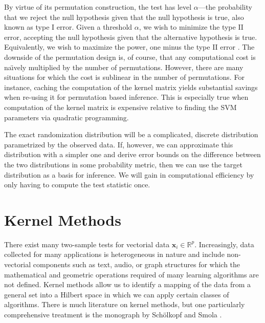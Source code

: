 By virtue of its permutation construction, the test has level $\alpha$---the
probability that we reject the null hypothesis given
that the null hypothesis is true, also known as type I error.  Given a
threshold $\alpha$, we wish to minimize the type II error, accepting
the null hypothesis given that the alternative hypothesis is true.
Equivalently, we wish to maximize the power, one minus the type II
error \cite{lehmann2005testing}.  The downside of the permutation
design is, of course, that any computational cost is na\"\i vely
multiplied by the number of permutations.  However, there are many
situations for which the cost is sublinear in the number of
permutations.  For instance, caching the computation of the kernel matrix
yields substantial savings when re-using it for permutation based
inference.  This is especially true when computation of the kernel
matrix is expensive relative to finding the SVM parameters via
quadratic programming.

The exact randomization distribution will be a complicated, discrete distribution
parametrized by the observed data.  If, however, we can approximate this
distribution with a simpler one and derive error bounds on the difference
between the two distributions in some probability metric, then we can
use the target distribution as a basis for inference.  We will gain in
computational efficiency by only having to compute the test statistic once.

\section{Kernel Methods}
There exist many two-sample tests for vectorial data $\mathbf{x}_i \in \mathbb{R}^p$.
Increasingly, data collected for many applications is heterogeneous in nature
and include non-vectorial components such as text, audio, or graph structures
for which the mathematical and geometric operations required of many learning
algorithms are not defined.  Kernel methods allow us to identify a mapping
of the data from a general set into a Hilbert space in which we can apply
certain classes of algorithms.  There is much literature on kernel methods,
but one particularly comprehensive treatment is the monograph by Sch{\"o}lkopf
and Smola \cite{scholkopf2002learning}.

